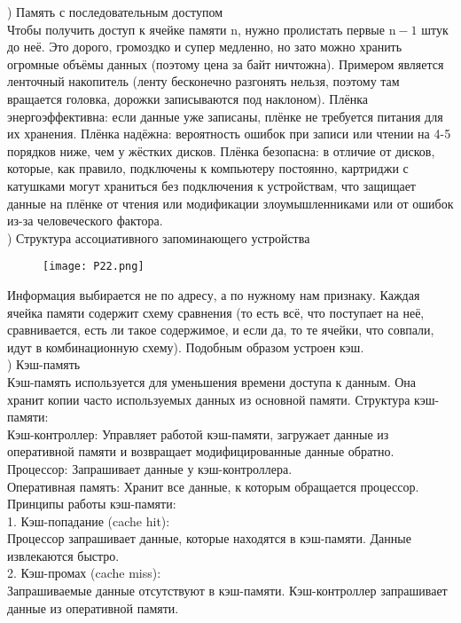 ) Память с последовательным доступом \\
Чтобы получить доступ к ячейке памяти n, нужно пролистать первые $\text{n}-1$ штук до неё. Это дорого, громоздко и супер медленно, но зато можно хранить огромные объёмы данных (поэтому цена за байт ничтожна). Примером является ленточный накопитель (ленту бесконечно разгонять нельзя, поэтому там вращается головка, дорожки записываются под наклоном). Плёнка энергоэффективна: если данные уже записаны, плёнке не требуется питания для их хранения. Плёнка надёжна: вероятность ошибок при записи или чтении на 4-5 порядков ниже, чем у жёстких дисков. Плёнка безопасна: в отличие от дисков, которые, как правило, подключены к компьютеру постоянно, картриджи с катушками могут храниться без подключения к устройствам, что защищает данные на плёнке от чтения или модификации злоумышленниками или от ошибок из-за человеческого фактора. \\

) Структура ассоциативного запоминающего
устройства \\
\begin{figure}[H]
    \centering
    \texttt{[image: P22.png]}
\end{figure}
\noindent Информация выбирается не по адресу, а по нужному нам признаку. Каждая ячейка памяти содержит схему сравнения (то есть всё, что поступает на неё, сравнивается, есть ли такое содержимое, и если да, то те ячейки, что совпали, идут в комбинационную схему). Подобным образом устроен кэш. \\
\newpage
{}) Кэш-память \\
Кэш-память используется для уменьшения времени доступа к данным. Она хранит копии часто используемых данных из основной памяти. Структура кэш-памяти: \\
Кэш-контроллер: Управляет работой кэш-памяти, загружает данные из оперативной памяти и возвращает модифицированные данные обратно. \\
Процессор: Запрашивает данные у кэш-контроллера. \\
Оперативная память: Хранит все данные, к которым обращается процессор. \\
Принципы работы кэш-памяти: \\
1. Кэш-попадание (cache hit): \\
Процессор запрашивает данные,
которые находятся в кэш-памяти. Данные извлекаются быстро. \\
2. Кэш-промах (cache miss): \\
Запрашиваемые данные отсутствуют в кэш-памяти. Кэш-контроллер запрашивает данные из оперативной памяти. \\

